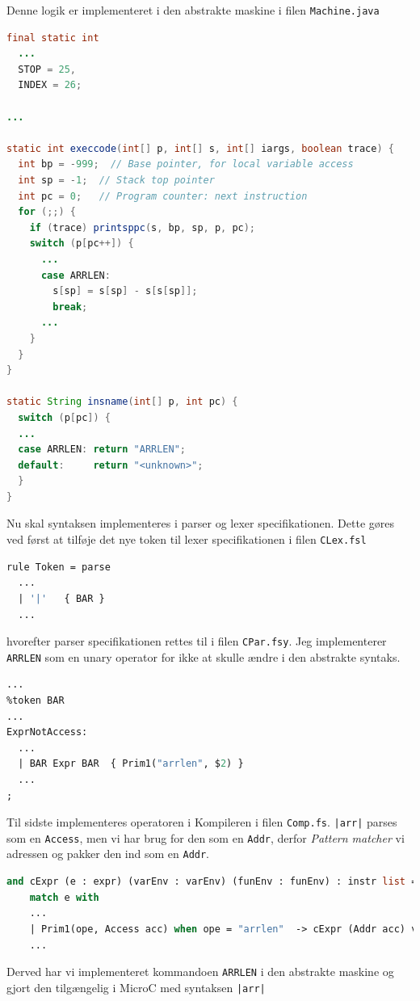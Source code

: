 \documentclass[danish,a4paper]{report}
\begin{document}
Denne logik er implementeret i den abstrakte maskine i filen \texttt{Machine.java}

\begin{lstlisting}[language=java]
final static int 
  ...
  STOP = 25,
  INDEX = 26;

...

static int execcode(int[] p, int[] s, int[] iargs, boolean trace) {
  int bp = -999;  // Base pointer, for local variable access 
  int sp = -1;  // Stack top pointer
  int pc = 0;   // Program counter: next instruction
  for (;;) {
    if (trace) printsppc(s, bp, sp, p, pc);
    switch (p[pc++]) {
      ...
      case ARRLEN:
        s[sp] = s[sp] - s[s[sp]];
        break;
      ...
    }
  }
}

static String insname(int[] p, int pc) {
  switch (p[pc]) {
  ...
  case ARRLEN: return "ARRLEN";
  default:     return "<unknown>";
  }
}
\end{lstlisting}

Nu skal syntaksen implementeres i parser og lexer specifikationen. Dette gøres ved først at tilføje det nye token til lexer specifikationen i filen \texttt{CLex.fsl}

\begin{lstlisting}[language=ML]
rule Token = parse
  ...
  | '|'   { BAR }
  ...
\end{lstlisting}

hvorefter parser specifikationen rettes til i filen \texttt{CPar.fsy}. Jeg implementerer \texttt{ARRLEN} som en unary operator for ikke at skulle ændre i den abstrakte syntaks.

\begin{lstlisting}[language=ML]
...
%token BAR
...
ExprNotAccess:
  ...
  | BAR Expr BAR  { Prim1("arrlen", $2) }
  ...
;
\end{lstlisting}

Til sidste implementeres operatoren i Kompileren i filen \texttt{Comp.fs}. \texttt{|arr|} parses som en \texttt{Access}, men vi har brug for den som en \texttt{Addr}, derfor \textit{Pattern matcher} vi adressen og pakker den ind som en \texttt{Addr}.

\begin{lstlisting}[language=ML]
and cExpr (e : expr) (varEnv : varEnv) (funEnv : funEnv) : instr list = 
    match e with
    ...
    | Prim1(ope, Access acc) when ope = "arrlen"  -> cExpr (Addr acc) varEnv funEnv @ [ARRLEN]
    ...
\end{lstlisting}

Derved har vi implementeret kommandoen \texttt{ARRLEN} i den abstrakte maskine og gjort den tilgængelig i MicroC med syntaksen \texttt{|arr|}
\end{document}
